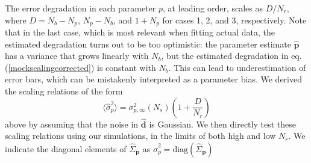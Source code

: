 \documentclass[reprint,aps,prd,superscriptaddress,showkeys,showpacs]{revtex4-1}
\newcommand{\bb}[1]{\mathbf{#1}}
\newcommand{\bbh}[1]{\mathbf{\hat{#1}}}
\newcommand{\h}[1]{\hat{#1}}
\begin{document}
%
The error degradation in each parameter $p$, at leading order, scales
as $D/N_r$, where $D=N_b-N_p$, $N_p-N_b$, and $1+N_p$ for cases 1, 2,
and 3, respectively.
Note that in the last case, which is most relevant when fitting actual data, the estimated degradation turns out to be too optimistic: the parameter estimate $\bbh{p}$ has a variance that grows linearly with $N_b$, but the estimated degradation in eq. (\ref{mockscalingcorrected}) is constant with $N_b$. This can lead to underestimation of error bars, which can be mistakenly interpreted as a parameter bias.  
We derived the scaling relations of the form
%
\begin{equation}
\label{ourscaling}
\langle\h{\sigma}_p^2\rangle = \sigma^2_{p,\infty}(N_s)\left(1+\frac{D}{N_r}\right)
\end{equation}
%
above by assuming that the noise in $\bbh{d}$ is Gaussian. We then directly test these scaling relations using our simulations, in the limits of both high and low $N_r$.
We indicate the diagonal elements of $\h{\Sigma}_{\bb{p}}$ as $\h{\sigma}^2_p=\mathrm{diag}(\h{\Sigma}_{\bb{p}})$ 
\end{document}
